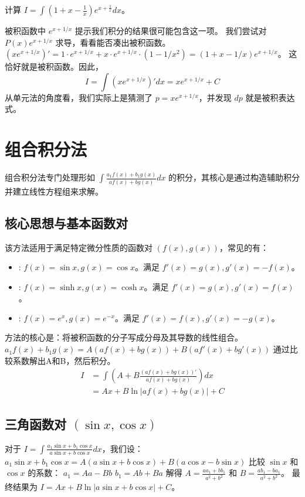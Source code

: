 \documentclass[lang=cn,newtx,10pt,scheme=chinese]{elegantbook}
\renewcommand{\textbf}[1]{\text{\heiti #1}}
\begin{document}
\begin{solution}
\begin{problem}
    计算 $I = \int(1+x-\frac{1}{x})e^{x+\frac{1}{x}}dx$。
\end{problem}
\begin{solution}
    被积函数中 $e^{x+1/x}$ 提示我们积分的结果很可能包含这一项。
    我们尝试对 $P(x)e^{x+1/x}$ 求导，看看能否凑出被积函数。
    $(x e^{x+1/x})' = 1 \cdot e^{x+1/x} + x \cdot e^{x+1/x} \cdot (1-1/x^2) = (1+x-1/x) e^{x+1/x}$。
    这恰好就是被积函数。因此，
    \begin{equation*}
        I = \int (x e^{x+1/x})' dx = x e^{x+1/x} + C
    \end{equation*}
    从单元法的角度看，我们实际上是猜测了 $p=xe^{x+1/x}$，并发现 $dp$ 就是被积表达式。
\end{solution}

\chapter{组合积分法}
组合积分法专门处理形如 $\int \frac{a_1 f(x) + b_1 g(x)}{a f(x) + b g(x)} dx$ 的积分，其核心是通过构造辅助积分并建立线性方程组来求解。

\section{核心思想与基本函数对}
该方法适用于满足特定微分性质的函数对 $(f(x), g(x))$，常见的有：
\begin{itemize}
    \item \textbf{三角函数对}: $f(x)=\sin x, g(x)=\cos x$。满足 $f'(x)=g(x), g'(x)=-f(x)$。
    \item \textbf{双曲函数对}: $f(x)=\sinh x, g(x)=\cosh x$。满足 $f'(x)=g(x), g'(x)=f(x)$。
    \item \textbf{指数函数对}: $f(x)=e^x, g(x)=e^{-x}$。满足 $f'(x)=f(x), g'(x)=-g(x)$。
\end{itemize}
方法的核心是：将被积函数的分子写成分母及其导数的线性组合。
$a_1 f(x) + b_1 g(x) = A(a f(x) + b g(x)) + B(a f'(x) + b g'(x))$
通过比较系数解出A和B，然后积分。
\begin{align*}
    I &= \int (A + B \frac{(a f(x) + b g(x))'}{a f(x) + b g(x)}) dx \\
      &= Ax + B \ln|a f(x) + b g(x)| + C
\end{align*}

\section{三角函数对 $(\sin x, \cos x)$}
对于 $I = \int \frac{a_1 \sin x + b_1 \cos x}{a \sin x + b \cos x} dx$，我们设：
$a_1 \sin x + b_1 \cos x = A(a \sin x + b \cos x) + B(a \cos x - b \sin x)$
比较 $\sin x$ 和 $\cos x$ 的系数：
$a_1 = Aa - Bb$
$b_1 = Ab + Ba$
解得 $A = \frac{aa_1+bb_1}{a^2+b^2}$ 和 $B = \frac{ab_1-ba_1}{a^2+b^2}$。
最终结果为 $I = Ax + B \ln|a \sin x + b \cos x| + C$。


\end{solution}
\end{document}
